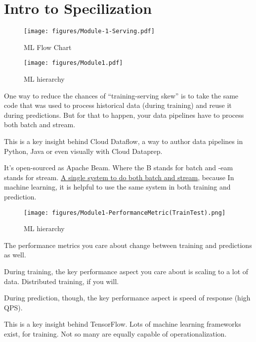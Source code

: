 \chapter{Intro to Specilization}



\begin{figure}[H]
	\centering
	\texttt{[image: figures/Module-1-Serving.pdf]}
	\caption{ML Flow Chart}
\end{figure}



\begin{figure}[H]
	\centering
	\texttt{[image: figures/Module1.pdf]}
	\caption{ML hierarchy}
\end{figure}



One way to reduce the chances of “training-serving skew” is to take the same code that was used to process historical data (during training) and reuse it during predictions. But for that to happen, your data pipelines have to process both batch and stream.

This is a key insight behind Cloud Dataflow, a way to author data pipelines in Python, Java or even visually with Cloud Dataprep.

It’s open-sourced as Apache Beam. Where the B stands for batch and -eam stands for stream. \underline{A single system to do both batch and stream}, because
In machine learning, it is helpful to use the same system in both training and
prediction.

\begin{figure}[H]
	\centering
	\texttt{[image: figures/Module1-PerformanceMetric(TrainTest).png]}
	\caption{ML hierarchy}
\end{figure}



The performance metrics you care about change between training and predictions as well.

During training, the key performance aspect you care about is scaling to a lot of data. Distributed training, if you will.

During prediction, though, the key performance aspect is speed of response (high QPS).

This is a key insight behind TensorFlow. Lots of machine learning frameworks exist, for training. Not so many are equally capable of operationalization.


